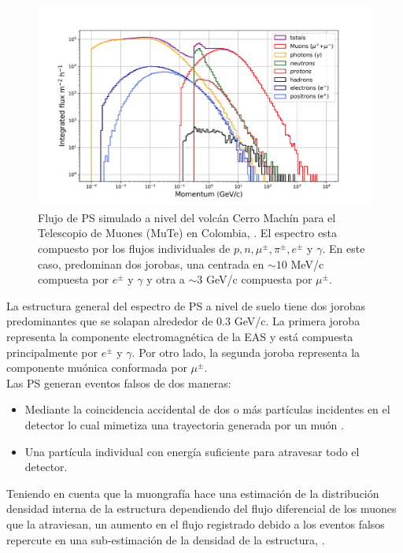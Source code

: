 \begin{figure}[h!]
\begin{center}
\includegraphics[width=1\textwidth]{Figures/PS_Flux}
\caption[Flujo de PS simulado a nivel del volcán Cerro Machín]{Flujo de PS simulado a nivel del volcán Cerro Machín para el Telescopio de Muones (MuTe) en Colombia, \cite{Vasquez2018, Valencia2016}. El espectro esta compuesto por los flujos individuales de $p,n,\mu^{\pm},\pi^{\pm},e^{\pm}$ y $\gamma$. En este caso, predominan dos jorobas, una centrada en $\sim 10$ MeV/c compuesta por $e^{\pm}$ y $\gamma$ y otra a $\sim 3$ GeV/c compuesta por $\mu^{\pm}$.}
\label{Particle_Flux}
\end{center}
\end{figure}

La estructura general del espectro de PS a nivel de suelo tiene dos jorobas predominantes que se solapan alrededor de 0.3 GeV/c. La primera joroba representa la componente electromagnética de la EAS y está compuesta principalmente por $e^{\pm}$ y $\gamma$. Por otro lado, la segunda joroba representa la componente muónica conformada por $\mu^{\pm}$.\\

Las PS generan eventos falsos de dos maneras:

\begin{itemize}
    \item Mediante la coincidencia accidental de dos o más partículas incidentes en el detector lo cual mimetiza una trayectoria generada por un muón \cite{KUSAGAYA2015}.
    \item Una partícula individual con energía suficiente para atravesar todo el detector.
\end{itemize}

Teniendo en cuenta que la muongrafía hace una estimación de la distribución densidad interna de la estructura dependiendo del flujo diferencial de los muones que la atraviesan, un aumento en el flujo registrado debido a los eventos falsos repercute en una sub-estimación de la densidad de la estructura, \cite{Nishiyama2014}.

